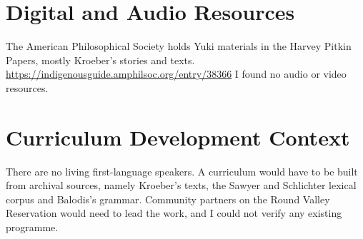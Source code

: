 \documentclass[12pt]{article}
\begin{document}
\section{Digital and Audio Resources}
The American Philosophical Society holds Yuki materials in the Harvey Pitkin Papers, mostly Kroeber's stories and texts. \url{https://indigenousguide.amphilsoc.org/entry/38366}
I found no audio or video resources.

\section{Curriculum Development Context}
There are no living first-language speakers. A curriculum would have to be built from archival sources, namely Kroeber's texts, the Sawyer and Schlichter lexical corpus and Balodis's grammar. Community partners on the Round Valley Reservation would need to lead the work, and I could not verify any existing programme.
\end{document}
